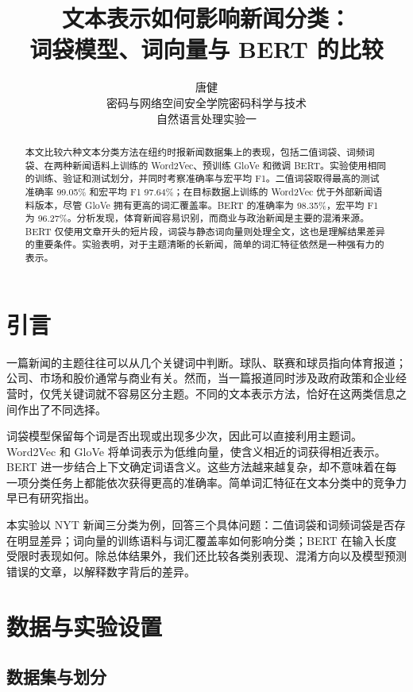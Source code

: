 \documentclass[11pt]{article}
\title{文本表示如何影响新闻分类：\\词袋模型、词向量与 BERT 的比较}
\author{唐健\quad 2412103\\
密码与网络空间安全学院\quad 密码科学与技术\\
自然语言处理实验一}
\begin{document}
\raggedbottom
\maketitle

\begin{abstract}
本文比较六种文本分类方法在纽约时报新闻数据集上的表现，包括二值词袋、词频词袋、在两种新闻语料上训练的 Word2Vec、预训练 GloVe 和微调 BERT。实验使用相同的训练、验证和测试划分，并同时考察准确率与宏平均 F1。二值词袋取得最高的测试准确率 99.05\% 和宏平均 F1 97.64\%；在目标数据上训练的 Word2Vec 优于外部新闻语料版本，尽管 GloVe 拥有更高的词汇覆盖率。BERT 的准确率为 98.35\%，宏平均 F1 为 96.27\%。分析发现，体育新闻容易识别，而商业与政治新闻是主要的混淆来源。BERT 仅使用文章开头的短片段，词袋与静态词向量则处理全文，这也是理解结果差异的重要条件。实验表明，对于主题清晰的长新闻，简单的词汇特征依然是一种强有力的表示。
\end{abstract}

\section{引言}

一篇新闻的主题往往可以从几个关键词中判断。球队、联赛和球员指向体育报道；公司、市场和股价通常与商业有关。然而，当一篇报道同时涉及政府政策和企业经营时，仅凭关键词就不容易区分主题。不同的文本表示方法，恰好在这两类信息之间作出了不同选择。

词袋模型保留每个词是否出现或出现多少次，因此可以直接利用主题词。Word2Vec 和 GloVe 将单词表示为低维向量，使含义相近的词获得相近表示。BERT 进一步结合上下文确定词语含义\citep{mikolov2013efficient,pennington-etal-2014-glove,devlin-etal-2019-bert}。这些方法越来越复杂，却不意味着在每一项分类任务上都能依次获得更高的准确率。简单词汇特征在文本分类中的竞争力早已有研究指出\citep{wang-manning-2012-baselines}。

本实验以 NYT 新闻三分类为例，回答三个具体问题：二值词袋和词频词袋是否存在明显差异；词向量的训练语料与词汇覆盖率如何影响分类；BERT 在输入长度受限时表现如何。除总体结果外，我们还比较各类别表现、混淆方向以及模型预测错误的文章，以解释数字背后的差异。

\section{数据与实验设置}

\subsection{数据集与划分}
\end{document}
